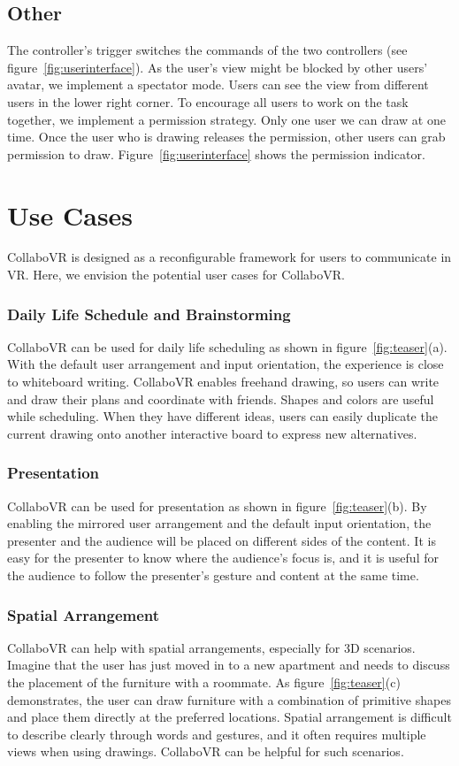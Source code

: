 \documentclass{sigchi}
\begin{document}
\subsection{Other}
The controller's trigger switches the commands of the two controllers (see figure~\ref{fig:userinterface}). As the user's view might be blocked by other users' avatar, we implement a spectator mode. Users can see the view from different users in the lower right corner. To encourage all users to work on the task together, we implement a permission strategy. Only one user we can draw at one time. Once the user who is drawing releases the permission, other users can grab permission to draw. Figure~\ref{fig:userinterface} shows the permission indicator.

\section{Use Cases}
CollaboVR is designed as a reconfigurable framework for users to communicate in VR. Here, we envision the potential user cases for CollaboVR.

\subsubsection{Daily Life Schedule and Brainstorming}
CollaboVR can be used for daily life scheduling as shown in figure~\ref{fig:teaser}(a). With the default user arrangement and input orientation, the experience is close to whiteboard writing. CollaboVR enables freehand drawing, so users can write and draw their plans and coordinate with friends. Shapes and colors are useful while scheduling. When they have different ideas, users can easily duplicate the current drawing onto another interactive board to express new alternatives.

\subsubsection{Presentation}
CollaboVR can be used for presentation as shown in figure~\ref{fig:teaser}(b). By enabling the mirrored user arrangement and the default input orientation, the presenter and the audience will be placed on different sides of the content. It is easy for the presenter to know where the audience's focus is, and it is useful for the audience to follow the presenter's gesture and content at the same time.

\subsubsection{Spatial Arrangement}
CollaboVR can help with spatial arrangements, especially for 3D scenarios. Imagine that the user has just moved in to a new apartment and needs to discuss the placement of the furniture with a roommate. As figure~\ref{fig:teaser}(c) demonstrates, the user can draw furniture with a combination of primitive shapes and place them directly at the preferred locations. Spatial arrangement is difficult to describe clearly through words and gestures, and it often requires multiple views when using drawings. CollaboVR can be helpful for such scenarios.
\end{document}
